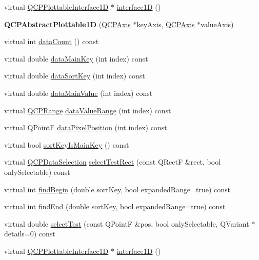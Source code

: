 \begin{DoxyCompactItemize}
\item 
virtual \hyperlink{class_q_c_p_plottable_interface1_d}{Q\+C\+P\+Plottable\+Interface1D} $\ast$ \hyperlink{class_q_c_p_abstract_plottable1_d_a3ab7511c279af967955369606c584dd6}{interface1D} ()
\item 
{\bfseries Q\+C\+P\+Abstract\+Plottable1D} (\hyperlink{class_q_c_p_axis}{Q\+C\+P\+Axis} $\ast$key\+Axis, \hyperlink{class_q_c_p_axis}{Q\+C\+P\+Axis} $\ast$value\+Axis)\hypertarget{class_q_c_p_abstract_plottable1_d_a30b2e50ab0afce65f104ea7a95440315}{}\label{class_q_c_p_abstract_plottable1_d_a30b2e50ab0afce65f104ea7a95440315}

\item 
virtual int \hyperlink{class_q_c_p_abstract_plottable1_d_a48c7d43c4b807984af205876a2e75a7d}{data\+Count} () const 
\item 
virtual double \hyperlink{class_q_c_p_abstract_plottable1_d_a602a79885c3df1ec026563f1dee1760d}{data\+Main\+Key} (int index) const 
\item 
virtual double \hyperlink{class_q_c_p_abstract_plottable1_d_acee62e95f889d32f43b151706e478aac}{data\+Sort\+Key} (int index) const 
\item 
virtual double \hyperlink{class_q_c_p_abstract_plottable1_d_a2f64db7173d82ed2b8208a0fd73bc08b}{data\+Main\+Value} (int index) const 
\item 
virtual \hyperlink{class_q_c_p_range}{Q\+C\+P\+Range} \hyperlink{class_q_c_p_abstract_plottable1_d_ace7509699fb338ac0971c6a3fb6770f6}{data\+Value\+Range} (int index) const 
\item 
virtual Q\+PointF \hyperlink{class_q_c_p_abstract_plottable1_d_af179f95c0937709c4c3efd880cad0522}{data\+Pixel\+Position} (int index) const 
\item 
virtual bool \hyperlink{class_q_c_p_abstract_plottable1_d_acb9084bcacdf653284ff21584eb82ba0}{sort\+Key\+Is\+Main\+Key} () const 
\item 
virtual \hyperlink{class_q_c_p_data_selection}{Q\+C\+P\+Data\+Selection} \hyperlink{class_q_c_p_abstract_plottable1_d_a711aa2c099de8adf5dc783000b76c4a4}{select\+Test\+Rect} (const Q\+RectF \&rect, bool only\+Selectable) const 
\item 
virtual int \hyperlink{class_q_c_p_abstract_plottable1_d_a34885a5083af3118a48b47c4bc8e53fe}{find\+Begin} (double sort\+Key, bool expanded\+Range=true) const 
\item 
virtual int \hyperlink{class_q_c_p_abstract_plottable1_d_a238634a604fd277be9717f28e272a347}{find\+End} (double sort\+Key, bool expanded\+Range=true) const 
\item 
virtual double \hyperlink{class_q_c_p_abstract_plottable1_d_ac21ea96ea14e7e79f843be048ce71160}{select\+Test} (const Q\+PointF \&pos, bool only\+Selectable, Q\+Variant $\ast$details=0) const 
\item 
virtual \hyperlink{class_q_c_p_plottable_interface1_d}{Q\+C\+P\+Plottable\+Interface1D} $\ast$ \hyperlink{class_q_c_p_abstract_plottable1_d_ab5f14406cf661087a8ed87baea37bc7e}{interface1D} ()
\end{DoxyCompactItemize}
